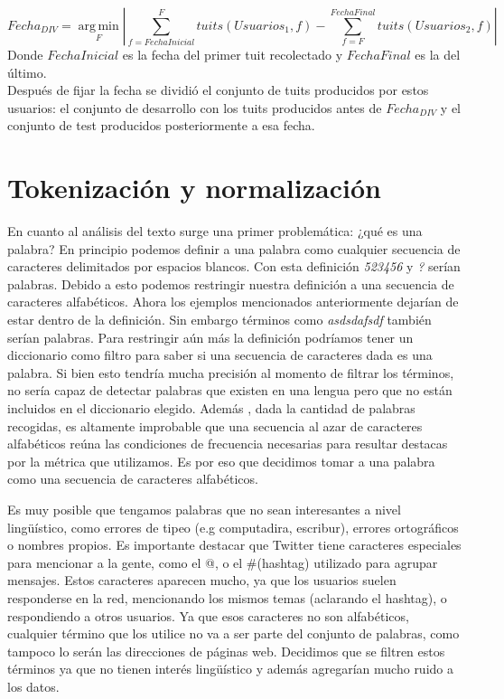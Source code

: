 \begin{equation}
 Fecha_{DIV}  = \operatorname*{arg\,min}_{F} \left|\sum_{ f = FechaInicial}^{F} tuits(Usuarios_1,f) - \sum_{ f = F}^{FechaFinal} tuits(Usuarios_2,f)\right|
\end{equation}
Donde $FechaInicial$ es la fecha del primer tuit recolectado  y $FechaFinal$ es la del último.\\

Después de fijar la fecha se dividió el conjunto de tuits producidos por estos usuarios: el conjunto de desarrollo con los tuits producidos antes de $Fecha_{DIV}$ y el conjunto de test producidos posteriormente a esa fecha.

\section{Tokenización y normalización}

En cuanto al análisis del texto surge una primer problemática: ¿qué es una palabra? En principio podemos definir a una palabra como cualquier secuencia de caracteres delimitados por espacios blancos. Con esta definición \textit{523456} y \textit{?} serían palabras. Debido a esto podemos restringir nuestra definición a una secuencia de caracteres alfabéticos. Ahora los ejemplos mencionados anteriormente dejarían de estar dentro de la definición. Sin embargo términos como \textit{asdsdafsdf} también serían palabras. Para restringir aún más la definición podríamos tener un diccionario como filtro para saber si una secuencia de caracteres dada es una palabra. Si bien esto tendría mucha precisión al momento de filtrar los términos, no sería capaz de detectar palabras que existen en una lengua pero que no están incluidos en el diccionario elegido. Además , dada la cantidad de palabras recogidas, es altamente improbable que una secuencia al azar de caracteres alfabéticos reúna las condiciones de frecuencia necesarias para resultar destacas por la métrica que utilizamos. Es por eso que decidimos tomar a una palabra como una secuencia de caracteres alfabéticos.

Es muy posible que tengamos palabras que no sean interesantes a nivel lingüístico, como errores de tipeo (e.g computadira, escribur), errores ortográficos o  nombres propios. Es importante destacar que Twitter tiene caracteres especiales para mencionar a la gente, como el @, o el \#(hashtag) utilizado para agrupar mensajes. Estos caracteres aparecen mucho, ya que los usuarios suelen responderse en la red, mencionando los mismos temas (aclarando el hashtag), o respondiendo a otros usuarios. Ya que esos caracteres no son alfabéticos, cualquier término que los utilice no va a ser parte del conjunto de palabras, como tampoco lo serán las direcciones de páginas web. Decidimos que se filtren estos términos ya que no tienen interés lingüístico y además agregarían mucho ruido a los datos.


